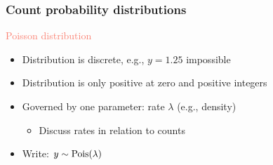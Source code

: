 \documentclass[dvipsnames]{beamer}
\begin{document}
\begin{frame}
 \frametitle{Count probability distributions}
 \begin{center}
 \textcolor{Salmon}{Poisson distribution}
 \end{center}

 \begin{itemize}
  \item<only@2> Distribution is discrete, e.g., $y = 1.25$ impossible
  \item Distribution is only positive at zero and positive integers
  \item Governed by one parameter: rate $\lambda$ (e.g., density)
  \begin{itemize}
  \item Discuss rates in relation to counts
  \end{itemize}
  \item Write: $y \sim \textnormal{Pois}(\lambda)$
 \end{itemize}
\end{frame}
\end{document}

